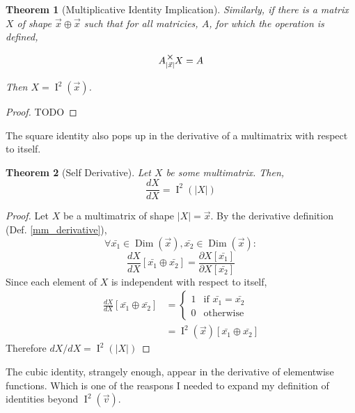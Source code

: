 \documentclass[12pt]{book}
\theoremstyle{plain}
\newtheorem{theorem}{Theorem}[chapter]
\theoremstyle{definition}
\theoremstyle{ppart}
\theoremstyle{case}
\theoremstyle{solution}
\DeclareMathOperator{\Dim}{Dim}
\DeclareMathOperator{\Ident}{I}
\newcommand{\mmult}[1]{\text{\raisebox{1ex}{$\underset{#1}{\times}$}}}
\begin{document}
\begin{theorem}[Multiplicative Identity Implication]
\label{mm_ident_imp}
Similarly, if there is a matrix $X$ of shape $\vec{x} \oplus \vec{x}$ such that
for all matricies, $A$, for which the operation is defined,

\[A \mmult{|\vec{x}|} X = A \]

Then $X = \Ident^2(\vec{x})$.
\end{theorem}
\begin{proof}
TODO
\end{proof}

The square identity also pops up in the derivative of a multimatrix
with respect to itself.

\begin{theorem}[Self Derivative]
\label{self_derivative}
Let $X$ be some multimatrix. Then,
\[ \frac{dX}{dX} = \Ident^2(|X|) \]
\end{theorem}
\begin{proof}
Let $X$ be a multimatrix of shape $|X|=\vec{x}$.
By the derivative definition (Def. \ref{mm_derivative}),
\[
 \forall \bar{x_1} \in \Dim(\vec{x}),
         \bar{x_2} \in \Dim(\vec{x}):
\]
\[
 \frac{dX}{dX}[\bar{x_1} \oplus \bar{x_2}] = 
 \frac{\partial X[\bar{x_1}]}{\partial X[\bar{x_2}]}
\]
Since each element of $X$ is independent with respect to itself,
\begin{align*}
 \frac{dX}{dX}[\bar{x_1} \oplus \bar{x_2}]
 &= \left\{
  \begin{array}{ll}
    1 & \mbox{if } \bar{x_1} = \bar{x_2} \\
    0 & \mbox{otherwise}
  \end{array}
 \right. \\
 &= \Ident^2(\vec{x})[\bar{x_1} \oplus \bar{x_2}]
\end{align*}
Therefore $dX/dX = \Ident^2(|X|)$
\end{proof}

The cubic identity, strangely enough, appear in the derivative of elementwise
functions. Which is one of the reaspons I needed to expand my definition of
identities beyond $\Ident^2(\vec{v})$.
\end{document}
